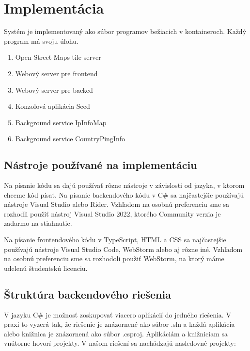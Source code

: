 \chapter{Implementácia}

\label{kap:implementacia}

Systém je implementovaný ako súbor programov bežiacich v kontaineroch. Každý program má svoju úlohu.
\begin{enumerate}
    \item Open Street Maps tile server
    \item Webový server pre frontend
    \item Webový server pre backed
    \item Konzolová aplikácia Seed
    \item Background service IpInfoMap
    \item Background service CountryPingInfo
\end{enumerate}

\section{Nástroje používané na implementáciu}

Na písanie kódu sa dajú používať rôzne nástroje v závislosti od jazyka, v ktorom chceme kód písať. Na písanie backendového kódu v C\# 
sa najčastejšie používajú nástroje Visual Studio alebo Rider. Vzhľadom na osobnú preferenciu sme sa rozhodli použiť nástroj Visual Studio 2022, 
ktorého Community verzia je zadarmo na stiahnutie.

Na písanie frontendového kódu v TypeScript, HTML a CSS sa najčastejšie používajú nástroje Visual Studio Code, WebStorm alebo aj rôzne iné. 
Vzhľadom na osobnú preferenciu sme sa rozhodoli použiť WebStorm, na ktorý máme udelenú študentskú licenciu.

\section{Štruktúra backendového riešenia}

V jazyku C\# je možnosť zoskupovať viacero aplikácií do jedného riešenia. V praxi to vyzerá tak, že riešenie je znázornené ako súbor .sln a každá 
aplikácia alebo knižnica je znázornená ako súbor .csproj. Aplikáciám a knižniciam sa vnútorne hovorí projekty. V našom riešení sa nachádzajú nasledovné 
projekty:

